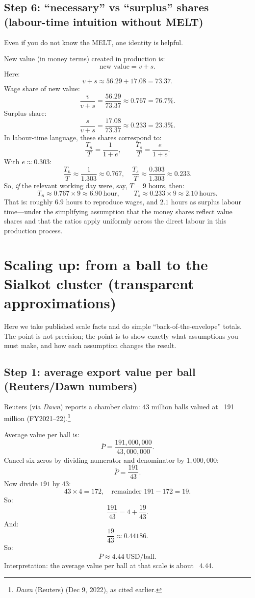 \documentclass[11pt]{article}
\newcommand{\USD}{\text{USD}}
\newcommand{\uBall}{\text{ball}}
\newcommand{\uHour}{\text{hour}}
\newcommand{\vvar}{v}   %
\newcommand{\splus}{s}  %
\newcommand{\eRate}{e}  %
\begin{document}
\subsection{Step 6: ``necessary'' vs ``surplus'' shares (labour-time intuition without MELT)}
Even if you do not know the MELT, one identity is helpful.

New value (in money terms) created in production is:
\[
  \text{new value} = \vvar + \splus.
\]
Here:
\[
  \vvar + \splus \approx 56.29 + 17.08 = 73.37.
\]
Wage share of new value:
\[
  \frac{\vvar}{\vvar+\splus} = \frac{56.29}{73.37}\approx 0.767 = 76.7\%.
\]
Surplus share:
\[
  \frac{\splus}{\vvar+\splus} = \frac{17.08}{73.37}\approx 0.233 = 23.3\%.
\]
In labour-time language, these shares correspond to:
\[
  \frac{T_n}{T}=\frac{1}{1+\eRate},\qquad
  \frac{T_s}{T}=\frac{\eRate}{1+\eRate}.
\]
With \(\eRate\approx 0.303\):
\[
  \frac{T_n}{T}\approx \frac{1}{1.303}\approx 0.767,\quad
  \frac{T_s}{T}\approx \frac{0.303}{1.303}\approx 0.233.
\]
So, \emph{if} the relevant working day were, say, \(T=9\) hours, then:
\[
  T_n \approx 0.767\times 9 \approx 6.90~\uHour,\qquad
  T_s \approx 0.233\times 9 \approx 2.10~\text{hours}.
\]
That is: roughly \(6.9\) hours to reproduce wages, and \(2.1\) hours as surplus labour time---under the simplifying
assumption that the money shares reflect value shares and that the ratios apply uniformly across the direct labour in this production process.

\section{Scaling up: from a ball to the Sialkot cluster (transparent approximations)}
Here we take published scale facts and do simple ``back-of-the-envelope'' totals. The point is not precision; the point is
to show exactly what assumptions you must make, and how each assumption changes the result.

\subsection{Step 1: average export value per ball (Reuters/Dawn numbers)}
Reuters (via \emph{Dawn}) reports a chamber claim: \(43\) million balls valued at \USD{}~191 million (FY2021--22).\footnote{\emph{Dawn} (Reuters) (Dec 9, 2022), as cited earlier.}

Average value per ball is:
\[
  \overline{P} = \frac{191{,}000{,}000}{43{,}000{,}000}.
\]
Cancel six zeros by dividing numerator and denominator by \(1{,}000{,}000\):
\[
  \overline{P} = \frac{191}{43}.
\]
Now divide \(191\) by \(43\):
\[
  43\times 4 = 172,\quad \text{remainder } 191-172 = 19.
\]
So:
\[
  \frac{191}{43} = 4 + \frac{19}{43}.
\]
And:
\[
  \frac{19}{43}\approx 0.44186.
\]
So:
\[
  \overline{P}\approx 4.44~\USD/\uBall.
\]
Interpretation: the average value per ball at that scale is about \USD{}~4.44.
\end{document}
